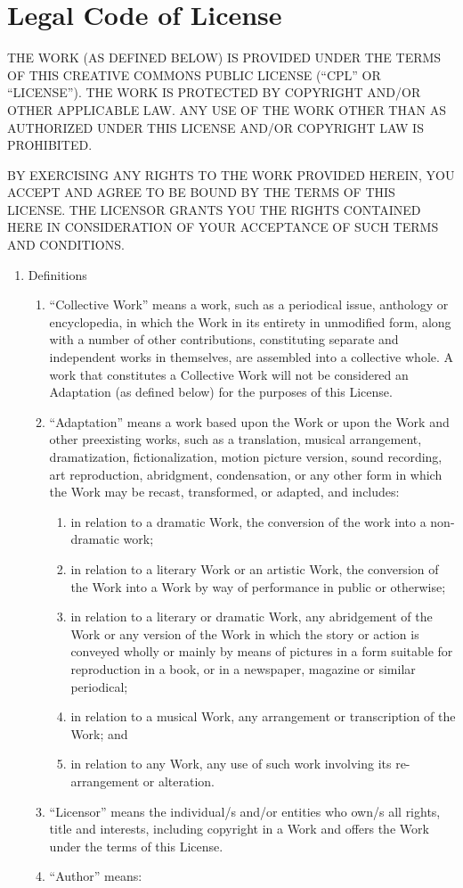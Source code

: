 \chapter{Legal Code of License}
\label{license}


THE WORK (AS DEFINED BELOW) IS PROVIDED UNDER THE TERMS OF THIS CREATIVE COMMONS PUBLIC LICENSE (``CPL'' OR ``LICENSE''). THE WORK IS PROTECTED BY COPYRIGHT AND/OR OTHER APPLICABLE LAW. ANY USE OF THE WORK OTHER THAN AS AUTHORIZED UNDER THIS LICENSE AND/OR COPYRIGHT LAW IS PROHIBITED.

BY EXERCISING ANY RIGHTS TO THE WORK PROVIDED HEREIN, YOU ACCEPT AND AGREE TO BE BOUND BY THE TERMS OF THIS LICENSE. THE LICENSOR GRANTS YOU THE RIGHTS CONTAINED HERE IN CONSIDERATION OF YOUR ACCEPTANCE OF SUCH TERMS AND CONDITIONS.

\begin{enumerate}
 \item {Definitions}
    \begin{enumerate}
       \item {``Collective Work'' means a work, such as a periodical issue, anthology or encyclopedia, in which the Work in its entirety in unmodified form, along with a number of other contributions, constituting separate and independent works in themselves, are assembled into a collective whole. A work that constitutes a Collective Work will not be considered an Adaptation (as defined below) for the purposes of this License.}
        \item { ``Adaptation'' means a work based upon the Work or upon the Work and other preexisting works, such as a translation, musical arrangement, dramatization, fictionalization, motion picture version, sound recording, art reproduction, abridgment, condensation, or any other form in which the Work may be recast, transformed, or adapted, and includes:}
	  \begin{enumerate}
	  \item {in relation to a dramatic Work, the conversion of the work into a non-dramatic work;}
	  \item {in relation to a literary Work or an artistic Work, the conversion of the Work into a Work by way of performance in public or otherwise;}
	  \item {in relation to a literary or dramatic Work, any abridgement of the Work or any version of the Work in which the story or action is conveyed wholly or mainly by means of pictures in a form suitable for reproduction in a book, or in a newspaper, magazine or similar periodical;}
	  \item{in relation to a musical Work, any arrangement or transcription of the Work; and}
	  \item{in relation to any Work, any use of such work involving its re-arrangement or alteration.}
	  \end{enumerate}
      \item {``Licensor'' means the individual/s and/or entities who own/s all rights, title and interests, including copyright in a Work and offers the Work under the terms of this License.}
      \item{ ``Author'' means:}


\end{enumerate}
\end{enumerate}
